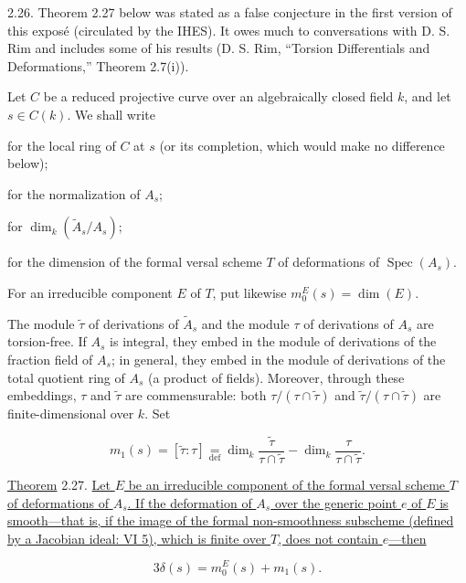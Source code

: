 2.26. Theorem 2.27 below was stated as a false conjecture in the first version
of this exposé (circulated by the IHES).  It owes much to conversations with
D. S. Rim and includes some of his results (D. S. Rim, ``Torsion
Differentials and Deformations,'' Theorem 2.7(i)).


Let $C$ be a reduced projective curve over an algebraically closed field $k$,
and let $s\in C(k)$.  We shall write

\begin{description}[leftmargin=2.7cm,style=nextline]
\item[$A_s$] for the local ring of $C$ at $s$ (or its completion, which would
make no difference below);
\item[$\widetilde A_s$] for the normalization of $A_s$;
\item[$\delta(s)$] for $\dim_k(\widetilde A_s/A_s)$;
\item[$m_0(s)$] for the dimension of the formal versal scheme $T$ of
deformations of $\operatorname{Spec}(A_s)$.
\end{description}

For an irreducible component $E$ of $T$, put likewise
$m_0^E(s)=\dim(E)$.

The module $\widetilde\tau$ of derivations of $\widetilde A_s$ and the module
$\tau$ of derivations of $A_s$ are torsion-free.  If $A_s$ is integral, they
embed in the module of derivations of the fraction field of $A_s$; in general,
they embed in the module of derivations of the total quotient ring of $A_s$
(a product of fields).  Moreover, through these embeddings, $\tau$ and
$\widetilde\tau$ are commensurable: both
$\tau/(\tau\cap\widetilde\tau)$ and
$\widetilde\tau/(\tau\cap\widetilde\tau)$ are finite-dimensional over $k$.
Set

\begin{equation*}
m_1(s)=[\widetilde\tau:\tau]
\mathrel{\mathop=\limits_{\mathrm{def}}}
\dim_k\frac{\widetilde\tau}{\tau\cap\widetilde\tau}
-\dim_k\frac{\tau}{\tau\cap\widetilde\tau}.
\end{equation*}

\underline{Theorem} 2.27. \underline{Let $E$ be an irreducible component of
the formal versal scheme $T$ of deformations of $A_s$. If the deformation of
$A_s$ over the generic point $e$ of $E$ is smooth---that is, if the image of
the formal non-smoothness subscheme (defined by a Jacobian ideal: VI 5), which
is finite over $T$, does not contain $e$---then}

\begin{equation*}
3\delta(s)=m_0^E(s)+m_1(s).
\end{equation*}


